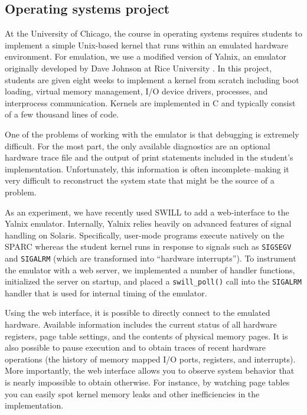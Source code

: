 \subsection{Operating systems project}

At the University of Chicago, the course in operating systems requires
students to implement a simple Unix-based kernel that runs within an
emulated hardware environment.  For emulation, we use a modified
version of Yalnix, an emulator originally developed by Dave Johnson at
Rice University \cite{yalnix}.
In this project, students are given eight
weeks to implement a kernel from scratch including boot loading,
virtual memory management, I/O device drivers, processes, and
interprocess communication.  Kernels are implemented in C and
typically consist of a few thousand lines of code.

One of the problems of working with the emulator is that debugging is
extremely difficult.  For the most part, the only available
diagnostics are an optional hardware trace file and the output
of print statements included in the student's implementation.
Unfortunately, this information is often incomplete--making it very
difficult to reconstruct the system state that might be the source of
a problem.

As an experiment, we have recently used SWILL to add a web-interface to the
Yalnix emulator. Internally, Yalnix relies heavily on advanced
features of signal handling on Solaris.  Specifically, user-mode
programs execute natively on the SPARC whereas the student kernel runs
in response to signals such as {\tt SIGSEGV} and {\tt SIGALRM} (which
are transformed into ``hardware interrupts'').  To instrument the emulator with
a web server, we implemented a number of handler functions,
initialized the server on startup, and placed a {\tt swill\_poll()}
call into the {\tt SIGALRM} handler that is used for internal timing of the emulator.

Using the web interface, it is possible to directly connect to the
emulated hardware.  Available information includes the current status
of all hardware registers, page table settings, and the contents of
physical memory pages.  It is also possible to pause execution and to
obtain traces of recent hardware operations (the history of memory
mapped I/O ports, registers, and interrupts).  More importantly, the
web interface allows you to observe system behavior that is nearly
impossible to obtain otherwise.  For instance, by watching page tables
you can easily spot kernel memory leaks and other inefficiencies in
the implementation.  

